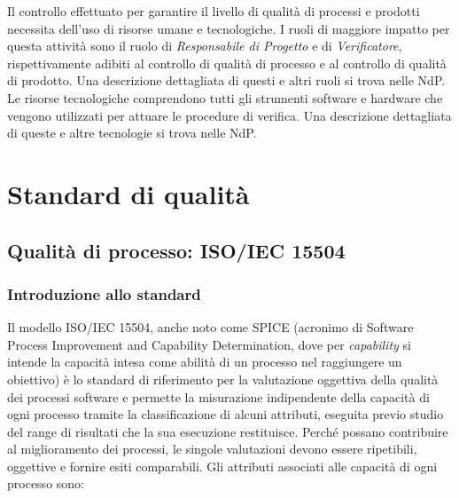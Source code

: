 \documentclass[openany,12pt,a4paper]{report}
\begin{document}
Il controllo effettuato per garantire il livello di qualità di processi e prodotti necessita dell'uso di risorse umane e tecnologiche. I ruoli di maggiore impatto per questa attività sono il ruolo di \textit{Responsabile di Progetto} e di \textit{Verificatore}, rispettivamente adibiti al controllo di qualità di processo e al controllo di qualità di prodotto. Una descrizione dettagliata di questi e altri ruoli si trova nelle NdP.
Le risorse tecnologiche comprendono tutti gli strumenti software e hardware che vengono utilizzati per attuare le procedure di verifica. Una descrizione dettagliata di queste e altre tecnologie si trova nelle NdP.

\appendix


\chapter{Standard di qualità}


\section{Qualità di processo: ISO/IEC 15504}

\subsection{Introduzione allo standard}

Il modello ISO/IEC 15504, anche noto come SPICE (acronimo di Software Process Improvement and Capability Determination, dove per \textit{capability} si intende la capacità intesa come abilità di un processo nel raggiungere un obiettivo) è lo standard di riferimento per la valutazione oggettiva della qualità dei processi software e permette la misurazione indipendente della capacità di ogni processo tramite la classificazione di alcuni attributi, eseguita previo studio del range di risultati che la sua esecuzione restituisce. Perché possano contribuire al miglioramento dei processi, le singole valutazioni devono essere ripetibili, oggettive e fornire esiti comparabili. Gli attributi associati alle capacità di ogni processo sono:
\end{document}
